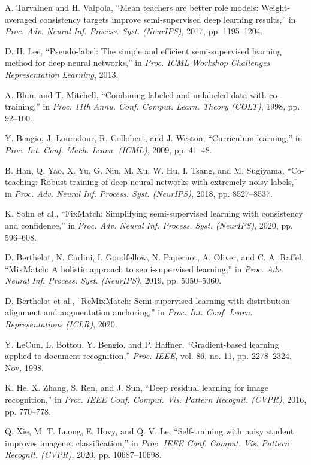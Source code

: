 \documentclass{ieeeaccess}
\begin{document}
\begin{thebibliography}{00}

 A. Tarvainen and H. Valpola, ``Mean teachers are better role models: Weight-averaged consistency targets improve semi-supervised deep learning results,'' in \emph{Proc. Adv. Neural Inf. Process. Syst. (NeurIPS)}, 2017, pp. 1195--1204.

 D. H. Lee, ``Pseudo-label: The simple and efficient semi-supervised learning method for deep neural networks,'' in \emph{Proc. ICML Workshop Challenges Representation Learning}, 2013.

 A. Blum and T. Mitchell, ``Combining labeled and unlabeled data with co-training,'' in \emph{Proc. 11th Annu. Conf. Comput. Learn. Theory (COLT)}, 1998, pp. 92--100.

 Y. Bengio, J. Louradour, R. Collobert, and J. Weston, ``Curriculum learning,'' in \emph{Proc. Int. Conf. Mach. Learn. (ICML)}, 2009, pp. 41--48.

 B. Han, Q. Yao, X. Yu, G. Niu, M. Xu, W. Hu, I. Tsang, and M. Sugiyama, ``Co-teaching: Robust training of deep neural networks with extremely noisy labels,'' in \emph{Proc. Adv. Neural Inf. Process. Syst. (NeurIPS)}, 2018, pp. 8527--8537.

 K. Sohn et al., ``FixMatch: Simplifying semi-supervised learning with consistency and confidence,'' in \emph{Proc. Adv. Neural Inf. Process. Syst. (NeurIPS)}, 2020, pp. 596--608.

 D. Berthelot, N. Carlini, I. Goodfellow, N. Papernot, A. Oliver, and C. A. Raffel, ``MixMatch: A holistic approach to semi-supervised learning,'' in \emph{Proc. Adv. Neural Inf. Process. Syst. (NeurIPS)}, 2019, pp. 5050--5060.

 D. Berthelot et al., ``ReMixMatch: Semi-supervised learning with distribution alignment and augmentation anchoring,'' in \emph{Proc. Int. Conf. Learn. Representations (ICLR)}, 2020.

 Y. LeCun, L. Bottou, Y. Bengio, and P. Haffner, ``Gradient-based learning applied to document recognition,'' \emph{Proc. IEEE}, vol. 86, no. 11, pp. 2278--2324, Nov. 1998.

 K. He, X. Zhang, S. Ren, and J. Sun, ``Deep residual learning for image recognition,'' in \emph{Proc. IEEE Conf. Comput. Vis. Pattern Recognit. (CVPR)}, 2016, pp. 770--778.

 Q. Xie, M. T. Luong, E. Hovy, and Q. V. Le, ``Self-training with noisy student improves imagenet classification,'' in \emph{Proc. IEEE Conf. Comput. Vis. Pattern Recognit. (CVPR)}, 2020, pp. 10687--10698.


\end{thebibliography}
\end{document}
